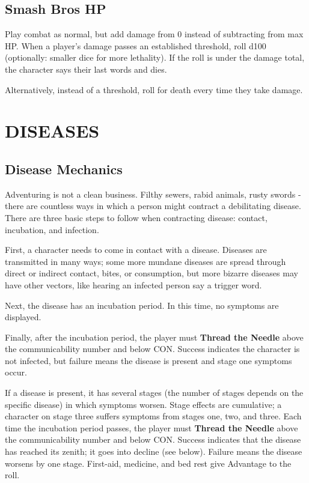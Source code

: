 \documentclass[twoside]{article}
\newcommand{\TTN}[2]{\textbf{Thread the Needle} above #1 and below #2}
\begin{document}
\subsection*{Smash Bros HP}

Play combat as normal, but add damage from 0 instead of subtracting from max HP. When a player's damage passes an established threshold, roll d100 (optionally: smaller dice for more lethality). If the roll is under the damage total, the character says their last words and dies. 

\bigbreak

Alternatively, instead of a threshold, roll for death every time they take damage.

\section*{DISEASES}

\subsection*{Disease Mechanics}

Adventuring is not a clean business. Filthy sewers, rabid animals, rusty swords - there are countless ways in which a person might contract a debilitating disease. There are three basic steps to follow when contracting disease: contact, incubation, and infection.

\bigbreak

First, a character needs to come in contact with a disease. Diseases are transmitted in many ways; some more mundane diseases are spread through direct or indirect contact, bites, or consumption, but more bizarre diseases may have other vectors, like hearing an infected person say a trigger word.

\bigbreak

Next, the disease has an incubation period. In this time, no symptoms are displayed.

\bigbreak

Finally, after the incubation period, the player must \TTN{the communicability number}{CON}. Success indicates the character is not infected, but failure means the disease is present and stage one symptoms occur.

\bigbreak

If a disease is present, it has several stages (the number of stages depends on the specific disease) in which symptoms worsen. Stage effects are cumulative; a character on stage three suffers symptoms from stages one, two, and three. Each time the incubation period passes, the player must \TTN{the communicability number}{CON}. Success indicates that the disease has reached its zenith; it goes into decline (see below). Failure means the disease worsens by one stage. First-aid, medicine, and bed rest give Advantage to the roll.
\end{document}
